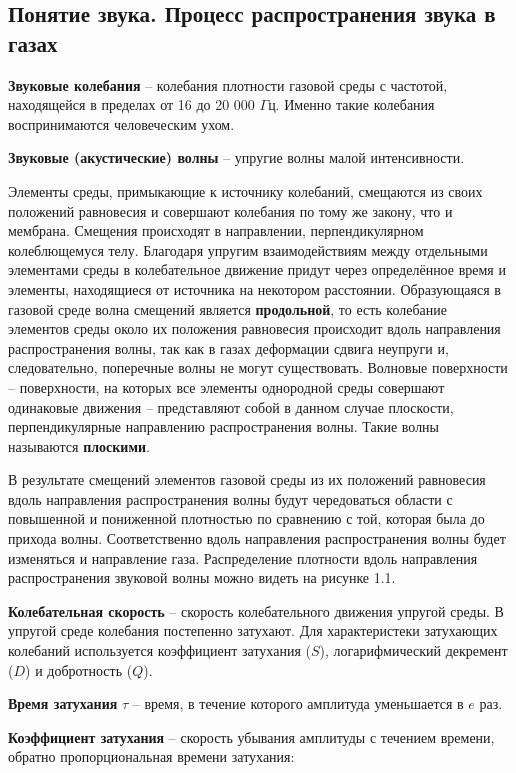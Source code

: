 \documentclass[referat,times]{SCWorks}
\begin{document}
\subsection{Понятие звука. Процесс распространения звука в газах}
\par \textbf{Звуковые колебания} -- колебания плотности газовой среды с частотой, находящейся в пределах от 16 до 20 000 $\Gamma$ц. Именно такие колебания воспринимаются человеческим ухом.
\par \textbf{Звуковые (акустические) волны} -- упругие волны малой интенсивности.
\par Элементы среды, примыкающие к источнику колебаний, смещаются из своих положений равновесия и совершают колебания по тому же закону, что и мембрана. Смещения происходят в направлении, перпендикулярном колеблющемуся телу. Благодаря упругим взаимодействиям между отдельными элементами среды в колебательное движение придут через определённое время и элементы, находящиеся от источника на некотором расстоянии. Образующаяся в газовой среде волна смещений является \textbf{продольной}, то есть колебание элементов среды около их положения равновесия происходит вдоль направления распространения волны, так как в газах деформации сдвига неупруги и, следовательно, поперечные волны не могут существовать. Волновые поверхности -- поверхности, на которых все элементы однородной среды совершают одинаковые движения -- представляют собой в данном случае плоскости, перпендикулярные направлению распространения волны. Такие волны называются \textbf{плоскими}.
\par В результате смещений элементов газовой среды из их положений равновесия вдоль направления распространения волны будут чередоваться области с повышенной и пониженной плотностью по сравнению с той, которая была до прихода волны. Соответственно вдоль направления распространения волны будет изменяться и направление газа. Распределение плотности вдоль направления распространения звуковой волны можно видеть на рисунке 1.1.
\par \textbf{Колебательная скорость} -- скорость колебательного движения упругой среды. В упругой среде колебания постепенно затухают. Для характеристеки затухающих колебаний используется коэффициент затухания ($S$), логарифмический декремент ($D$) и добротность ($Q$).
\par \textbf{Время затухания} $\tau$ -- время, в течение которого амплитуда уменьшается в $e$ раз.
\par \textbf{Коэффициент затухания} -- скорость убывания амплитуды с течением времени, обратно пропорциональная времени затухания:
\end{document}
